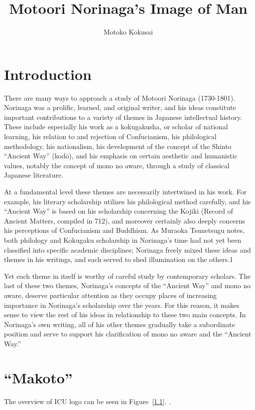 \documentclass[12pt]{report}
\title{Motoori Norinaga’s Image of Man}
\author{Motoko Kokusai}
\date{}
\begin{document}

\doublespacing

\setcounter{tocdepth}{3}
\tableofcontents

\chapter{Introduction}
There are many ways to approach a study of Motoori Norinaga (1730-1801). Norinaga was
a prolific, learned, and original writer, and his ideas constitute important contributions to a
variety of themes in Japanese intellectual history. These include especially his work as a
kokugakusha, or scholar of national learning, his relation to and rejection of Confucianism,
his philological methodology, his nationalism, his development of the concept of the Shinto
“Ancient Way” (kodō), and his emphasis on certain aesthetic and humanistic values, notably
the concept of mono no aware, through a study of classical Japanese literature.

At a fundamental level these themes are necessarily intertwined in his work. For
example, his literary scholarship utilizes his philological method carefully, and his “Ancient
Way” is based on his scholarship concerning the Kojiki (Record of Ancient Matters, compiled
in 712), and moreover certainly also deeply concerns his perceptions of Confucianism and
Buddhism. As Muraoka Tsunetsugu notes, both philology and Kokugaku scholarship in
Norinaga's time had not yet been classified into specific academic disciplines; Norinaga
freely mixed these ideas and themes in his writings, and each served to shed illumination on
the others.1

Yet each theme in itself is worthy of careful study by contemporary scholars. The last of
these two themes, Norinaga's concepts of the “Ancient Way” and mono no aware, deserve
particular attention as they occupy places of increasing importance in Norinaga's scholarship
over the years. For this reason, it makes sense to view the rest of his ideas in relationship to
these two main concepts. In Norinaga's own writing, all of his other themes gradually take
a subordinate position and serve to support his clarification of mono no aware and the
“Ancient Way.”


\chapter{“Makoto”}
The overview of ICU logo can be seen in Figure~\ref{1.1}.
\cite{Ishikawa1984}. 
\end{document}
